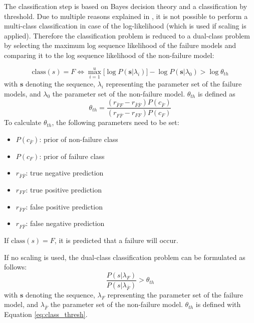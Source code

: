 \documentclass[mscthesis]{usiinfthesis}
\begin{document}
The classification step is based on Bayes decision theory and a classification
by threshold. Due to multiple reasons explained in \cite{salfner08}, it is not
possible to perform a multi-class classification in case of the log-likelihood
(which is used if scaling is applied). Therefore the classification problem is
reduced to a dual-class problem by selecting the maximum log sequence
likelihood of the failure models and comparing it to the log sequence
likelihood of the non-failure model:

\begin{equation}
    \label{eq:class}
    \text{class}(s) = F \iff \max_{i=1}^{u} \big [
        \log P(\boldsymbol{s}|\lambda_i)
    \big ] - \log P(\boldsymbol{s}|\lambda_0) > \log \theta_{th}
\end{equation}
with $\boldsymbol{s}$ denoting the sequence, $\lambda_i$ representing the
parameter set of the failure models, and $\lambda_0$ the parameter set of the
non-failure model. $\theta_{th}$ is defined as
\begin{equation}
    \label{eq:class_thresh}
    \theta_{th} = \frac{(r_{\bar{F}F} - r_{\bar{F}\bar{F}})P(c_{\bar{F}})}
        {(r_{F \bar{F}} - r_{FF})P(c_{F})}
\end{equation}
To calculate $\theta_{th}$, the following parameters need to be set:
\begin{itemize}
    \item $ P(c_{\bar{F}}) $: prior of non-failure class
    \item $ P(c_F) $: prior of failure class
    \item $ r_{\bar{F}\bar{F}} $: true negative prediction
    \item $ r_{FF} $: true positive prediction
    \item $ r_{\bar{F}F} $: false positive prediction
    \item $ r_{F\bar{F}} $: false negative prediction
\end{itemize}
If $\text{class}(s) = F$, it is predicted that a failure will occur.

If no scaling is used, the dual-class classification problem can be formulated
as follows:
\begin{equation}
    \label{eq:class_ns}
    \frac{P(s|\lambda_F)}{P(s|\lambda_{\bar{F}})} > \theta_{th}
\end{equation}
with $\boldsymbol{s}$ denoting the sequence, $\lambda_F$ representing the
parameter set of the failure model, and $\lambda_{\bar{F}}$ the parameter set
of the non-failure model. $\theta_{th}$ is defined with Equation
\ref{eq:class_thresh}.
\end{document}
